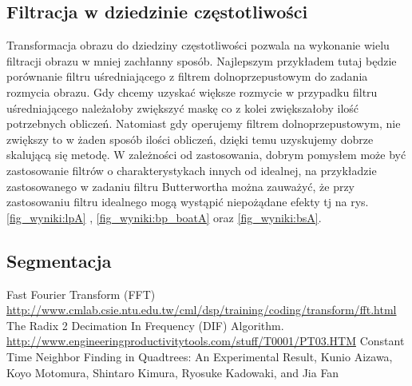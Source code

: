 \documentclass{classrep}
\begin{document}
\subsection{Filtracja w dziedzinie częstotliwości}

Transformacja obrazu do dziedziny częstotliwości pozwala na wykonanie wielu filtracji obrazu w mniej zachłanny sposób. Najlepszym przykładem tutaj będzie porównanie filtru uśredniającego z filtrem dolnoprzepustowym do zadania rozmycia obrazu. Gdy chcemy uzyskać większe rozmycie w przypadku filtru uśredniającego należałoby zwiększyć maskę co z kolei zwiększałoby ilość potrzebnych obliczeń. Natomiast gdy operujemy filtrem dolnoprzepustowym, nie zwiększy to w żaden sposób ilości obliczeń, dzięki temu uzyskujemy dobrze skalującą się metodę. W zależności od zastosowania, dobrym pomysłem może być zastosowanie filtrów o charakterystykach innych od idealnej, na przykładzie zastosowanego w zadaniu filtru Butterwortha można zauważyć, że przy zastosowaniu filtru idealnego mogą wystąpić niepożądane efekty tj na rys. \ref{fig_wyniki:lpA} , \ref{fig_wyniki:bp_boatA} oraz \ref{fig_wyniki:bsA}. 


\subsection{Segmentacja}



\begin{thebibliography}{8}

 Fast Fourier Transform (FFT) \url{http://www.cmlab.csie.ntu.edu.tw/cml/dsp/training/coding/transform/fft.html}
 The Radix 2 Decimation In Frequency (DIF) Algorithm.  \url{http://www.engineeringproductivitytools.com/stuff/T0001/PT03.HTM}
 Constant Time Neighbor Finding in Quadtrees: An Experimental Result, Kunio Aizawa, Koyo Motomura, Shintaro Kimura, Ryosuke Kadowaki, and Jia Fan
\end{thebibliography}
\end{document}
